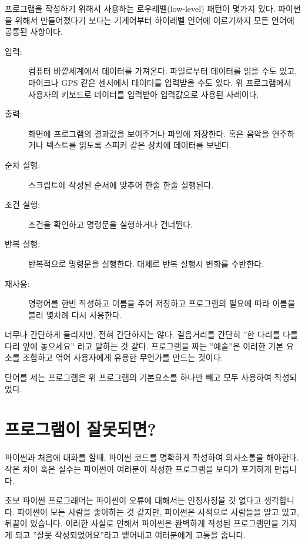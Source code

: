 프로그램을 작성하기 위해서 사용하는 로우레벨(low-level) 패턴이 몇가지 있다. 파이썬을 위해서 만들어졌다기 보다는 기계어부터 하이레벨 언어에 이르기까지 모든 언어에 공통된 사항이다.

\begin{description}

\item[입력:] 컴퓨터 바깥세계에서 데이터를 가져온다. 파일로부터 데이터를 읽을 수도 있고, 마이크나 GPS 같은 센서에서 데이터를 입력받을 수도 있다. 위 프로그램에서 사용자의 키보드로 데이터를 입력받아 입력값으로 사용된 사례이다.

\item[출력:] 화면에 프로그램의 결과값을 보여주거나 파일에 저장한다. 혹은 음악을 연주하거나 텍스트를 읽도록 스피커 같은 장치에 데이터를 보낸다.

\item[순차 실행:] 스크립트에 작성된 순서에 맞추어 한줄 한줄 실행된다.

\item[조건 실행:] 조건을 확인하고 명령문을 실행하거나 건너뛴다.

\item[반복 실행:] 반복적으로 명령문을 실행한다. 대체로 반복 실행시 변화를 수반한다.

\item[재사용:] 명령어를 한번 작성하고 이름을 주어 저장하고 프로그램의 필요에 따라 이름을 불러 몇차례 다시 사용한다.

\end{description}

너무나 간단하게 들리지만, 전혀 간단하지는 않다. 걸음거리를 간단히 ''한 다리를 다를 다리 앞에 놓으세요'' 라고 말하는 것 같다. 프로그램을 짜는 ''예술''은 이러한 기본 요소를 조합하고 엮어 사용자에게 유용한 무언가를 만드는 것이다.

단어를 세는 프로그램은 위 프로그램의 기본요소를 하나만 빼고 모두 사용하여 작성되었다.


\section{프로그램이 잘못되면?}

파이썬과 처음에 대화를 할때, 파이썬 코드를 명확하게 작성하여 의사소통을 해야한다. 작은 차이 혹은 실수는 파이썬이 여러분이 작성한 프로그램을 보다가 포기하게 만듭니다.

초보 파이썬 프로그래머는 파이썬이 오류에 대해서는 인정사정볼 것 없다고 생각합니다. 파이썬이 모든 사람을 좋아하는 것 같지만, 파이썬은 사적으로 사람들을 알고 있고, 뒤끝이 있습니다. 이러한 사실로 인해서 파이썬은 완벽하게 작성된 프로그램만을 가지게 되고 ''잘못 작성되었어요''라고 뱉어내고 여러분에게 고통을 줍니다.

